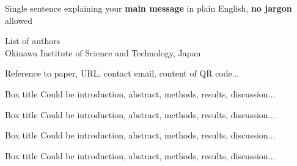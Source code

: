 \documentclass[
    a0paper, %
    portrait, %
    fontscale=0.4 %
    ]{baposter}
\begin{document}
\begin{poster}
\begin{posterbox}
\begin{minipage}[c][ 0.4 \textheight ]{0.6\textwidth}
        Single sentence explaining your  \textbf{main message} in plain English, \textbf{no jargon} allowed

        \vspace{2em}
        
        \LARGE 
        List of authors\\ 
        Okinawa Institute of Science and Technology, Japan
    \end{minipage}

    \vspace{-5em} \hfill 
    \colorbox{white}{ 
    } \hspace{0.3em}

    \vspace{0.3em}
    \hfill {\normalsize Reference to paper, URL, contact email, content of QR code... }
    \vspace{0.3em}

\end{posterbox}



\begin{posterbox}[
    name = box1,  %
    column = 0, %
    below = message %
    ]{Box title}
    Could be introduction, abstract, methods, results, discussion...
\end{posterbox}


\begin{posterbox}[
    name = box2,  %
    column = 1, %
    below = message %
    ]{Box title}
    Could be introduction, abstract, methods, results, discussion...
\end{posterbox}


\begin{posterbox}[
    name = box3,  %
    column = 2, %
    below = message %
    ]{Box title}
    Could be introduction, abstract, methods, results, discussion...
\end{posterbox}


\begin{posterbox}[
    name = box4,  %
    column = 0, %
    below = box1 %
    ]{Box title}
    Could be introduction, abstract, methods, results, discussion...
\end{posterbox}



\end{poster}
\end{document}
